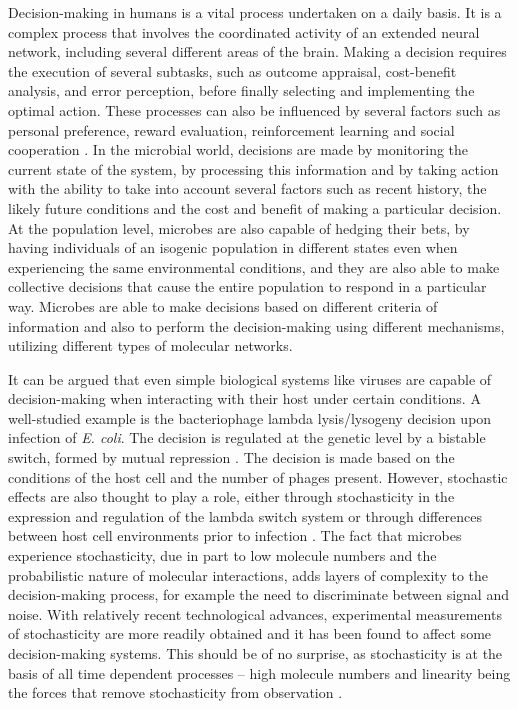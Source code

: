 Decision-making in humans is a vital process undertaken on a daily basis. It is a complex process that involves the coordinated activity of an extended neural network, including several different areas of the brain. Making a decision requires the execution of several subtasks, such as outcome appraisal, cost-benefit analysis, and error perception, before finally selecting and implementing the optimal action. These processes can also be influenced by several factors such as personal preference, reward evaluation, reinforcement learning and social cooperation \cite{assadi_dopamine_2009,gleichgerrcht_decision-making_2010}. In the microbial world, decisions are made by monitoring the current state of the system, by processing this information and by taking action with the ability to take into account several factors such as recent history, the likely future conditions and the cost and benefit of making a particular decision. At the population level, microbes are also capable of hedging their bets, by having individuals of an isogenic population in different states even when experiencing the same environmental conditions, and they are also able to make collective decisions that cause the entire population to respond in a particular way. Microbes are able to make decisions based on different criteria of information and also to perform the decision-making using different mechanisms, utilizing different types of molecular networks.

It can be argued that even simple biological systems like viruses are capable of decision-making when interacting with their host under certain conditions. A well-studied example is the bacteriophage lambda lysis/lysogeny decision upon infection of \textit{E. coli}. The decision is regulated at the genetic level by a bistable switch, formed by mutual repression \cite{wegrzyn_genetic_2005}. The decision is made based on the conditions of the host cell and the number of phages present. However, stochastic effects are also thought to play a role, either through stochasticity in the expression and regulation of the lambda switch system \cite{arkin_stochastic_1998} or through differences between host cell environments prior to infection \cite{st-pierre_determination_2008}. The fact that microbes experience stochasticity, due in part to low molecule numbers and the probabilistic nature of molecular interactions, adds layers of complexity to the decision-making process, for example the need to discriminate between signal and noise. With relatively recent technological advances, experimental measurements of stochasticity are more readily obtained and it has been found to affect some decision-making systems. This should be of no surprise, as stochasticity is at the basis of all time dependent processes – high molecule numbers and linearity being the forces that remove stochasticity from observation \cite{westerhoff_thermodynamics_1987}.

